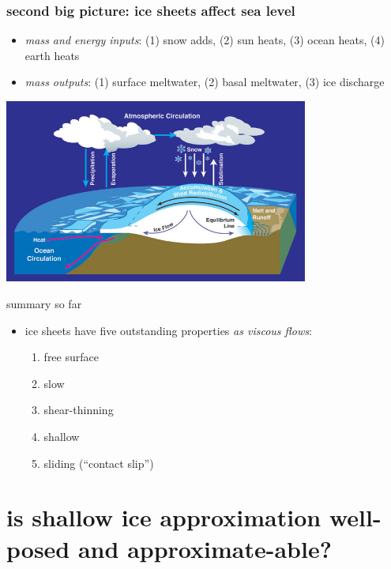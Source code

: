 \documentclass[hide notes,intlimits]{beamer}
\begin{document}
\begin{frame}
  \frametitle{second big picture: ice sheets affect sea level}
\medskip
\small
\begin{itemize}
\item \emph{mass and energy inputs}: (1) snow adds, (2) sun heats, (3) ocean heats, (4) earth heats
\item \emph{mass outputs}: (1) surface meltwater, (2) basal meltwater, (3) ice discharge
\end{itemize}
\begin{center}
  \includegraphics[width=0.75\textwidth]{mass-bal-atmos}
\end{center}
\end{frame}


\begin{frame}{summary so far}
\begin{itemize}
\item ice sheets have five outstanding properties \emph{as viscous flows}:
  \begin{enumerate}
  \item \alert{free surface}
  \item \alert{slow}
  \item \alert{shear-thinning}
  \item \alert{shallow}
  \item \alert{sliding (``contact slip'')}
  \end{enumerate}
\end{itemize}
\end{frame}


\section[shallow ice well-posed?]{is shallow ice approximation well-posed and approximate-able?}
\end{document}
